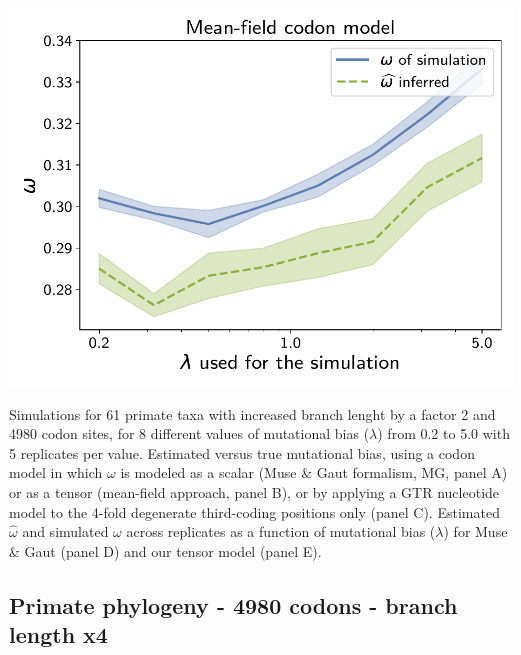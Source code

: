 \documentclass{article}
\begin{document}
\begin{center}
\begin{minipage}{0.325\linewidth}
        \includegraphics[width=\linewidth, page=1]{inference_supp_mat/PrimatesExons10Mu2.0_omega_MF.pdf}
    \end{minipage}
\end{center}
Simulations for 61 primate taxa with increased branch lenght by a factor 2 and 4980 codon sites, for 8 different values of mutational bias ($\lambda$) from 0.2 to 5.0 with 5 replicates per value.
Estimated versus true mutational bias, using a codon model in which $\omega$ is modeled as a scalar (Muse \& Gaut formalism, MG, panel A) or as a tensor (mean-field approach, panel B), or by applying a GTR nucleotide model to the 4-fold degenerate third-coding positions only (panel C).
Estimated $\hat{\omega}$ and simulated $\omega$ across replicates as a function of mutational bias ($\lambda$) for Muse \& Gaut (panel D) and our tensor model (panel E).

\subsection{Primate phylogeny - 4980 codons - branch length x4}
\end{document}
